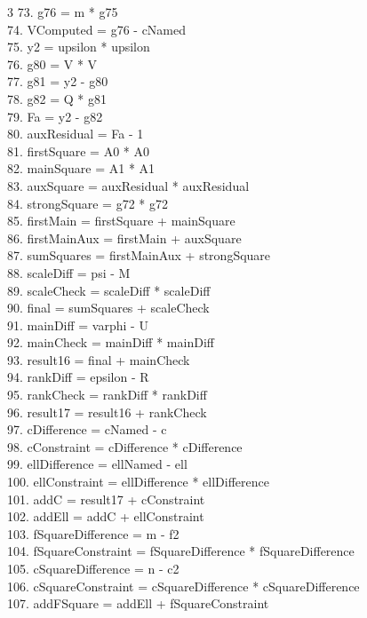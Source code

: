 \documentclass[10pt]{article}
\begin{document}
\begin{multicols}{3}
73. g76 = m * g75\\
74. VComputed = g76 - cNamed\\
75. y2 = upsilon * upsilon\\
76. g80 = V * V\\
77. g81 = y2 - g80\\
78. g82 = Q * g81\\
79. Fa = y2 - g82\\
80. auxResidual = Fa - 1\\
81. firstSquare = A0 * A0\\
82. mainSquare = A1 * A1\\
83. auxSquare = auxResidual * auxResidual\\
84. strongSquare = g72 * g72\\
85. firstMain = firstSquare + mainSquare\\
86. firstMainAux = firstMain + auxSquare\\
87. sumSquares = firstMainAux + strongSquare\\
88. scaleDiff = psi - M\\
89. scaleCheck = scaleDiff * scaleDiff\\
90. final = sumSquares + scaleCheck\\
91. mainDiff = varphi - U\\
92. mainCheck = mainDiff * mainDiff\\
93. result16 = final + mainCheck\\
94. rankDiff = epsilon - R\\
95. rankCheck = rankDiff * rankDiff\\
96. result17 = result16 + rankCheck\\
97. cDifference = cNamed - c\\
98. cConstraint = cDifference * cDifference\\
99. ellDifference = ellNamed - ell\\
100. ellConstraint = ellDifference * ellDifference\\
101. addC = result17 + cConstraint\\
102. addEll = addC + ellConstraint\\
103. fSquareDifference = m - f2\\
104. fSquareConstraint = fSquareDifference * fSquareDifference\\
105. cSquareDifference = n - c2\\
106. cSquareConstraint = cSquareDifference * cSquareDifference\\
107. addFSquare = addEll + fSquareConstraint\\

\end{multicols}
\end{document}
